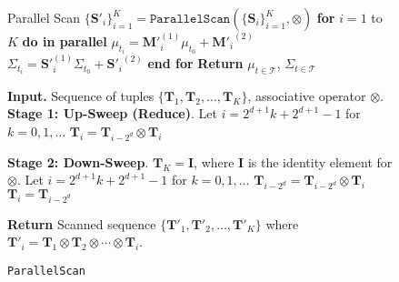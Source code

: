 \begin{figure}[!t]
\begin{minipage}[t]{0.54\textwidth}
\begin{algorithm}[H]
\begin{algorithmic}[1]
    \STATE Parallel Scan $\{\mathbf{S}'_i\}_{i=1}^K = \texttt{ParallelScan}(\{\mathbf{S}_i\}_{i=1}^K, \otimes)$
    \STATE \textbf{for} $i = 1$ to $K$ \textbf{do in parallel}
        \STATE \hspace{2mm} $\mu_{t_i} = {\mathbf{M}'}_i^{(1)} \mu_{t_0} + {\mathbf{M}'_i}^{(2)}$
        \STATE \hspace{2mm} $\Sigma_{t_i} = {\mathbf{S}'}_i^{(1)} \Sigma_{t_0} + {\mathbf{S}'_i}^{(2)}$
    \STATE \textbf{end for}
\STATE \textbf{Return} $\mu_{t \in \mathcal{T}}$, $\Sigma_{t \in \mathcal{T}}$
\end{algorithmic}
\end{algorithm}
\end{minipage}
\begin{minipage}[t]{0.45\textwidth}
\begin{algorithm}[H]
\caption{\texttt{ParallelScan}}\label{alg:parallel_scan_procedure}
\begin{algorithmic}[1]
\STATE \textbf{Input. } Sequence of tuples $\{\mathbf{T}_1, \mathbf{T}_2, \ldots, \mathbf{T}_K\}$, associative operator $\otimes$.
    \STATE \textbf{Stage 1: Up-Sweep (Reduce)}.
            \STATE Let $i = 2^{d+1}k + 2^{d+1} - 1$ for $k = 0, 1, \ldots$
                \STATE $\mathbf{T}_i = \mathbf{T}_{i - 2^d} \otimes \mathbf{T}_i$
            \ENDIF
        \ENDFOR
    \ENDFOR
    
    \STATE \textbf{Stage 2: Down-Sweep}.
    \STATE $\mathbf{T}_K = \mathbf{I}$, where $\mathbf{I}$ is the identity element for $\otimes$.
            \STATE Let $i = 2^{d+1}k + 2^{d+1} - 1$ for $k = 0, 1, \ldots$
                \STATE $\mathbf{T}_{i - 2^d} = \mathbf{T}_{i - 2^d} \otimes \mathbf{T}_i$
                \STATE $\mathbf{T}_i = \mathbf{T}_{i - 2^d}$
            \ENDIF
        \ENDFOR
    \ENDFOR
    
    \STATE \textbf{Return}  Scanned sequence $\{\mathbf{T}'_1, \mathbf{T}'_2, \ldots, \mathbf{T}'_K\}$ where $\mathbf{T}'_i = \mathbf{T}_1 \otimes \mathbf{T}_2 \otimes \cdots \otimes \mathbf{T}_i$.
\end{algorithmic}
\end{algorithm}
\end{minipage}
\end{figure}

